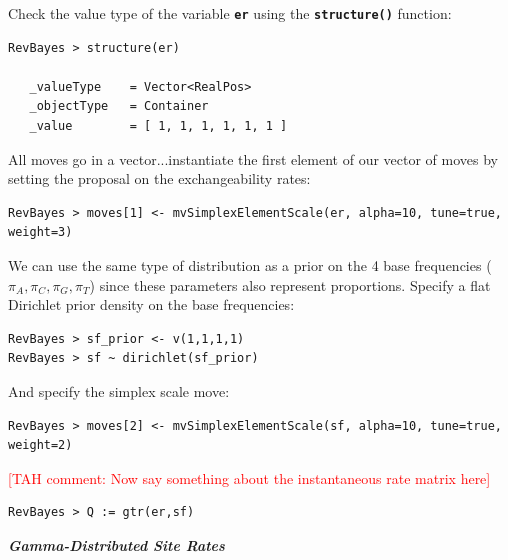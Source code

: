 \documentclass[11pt]{article}
\newcommand{\taha}[1]{{\textcolor{red}{[TAH comment: #1]}}} %
\newcommand{\cl}[1]{{\texttt{\textbf{#1}}}}
\begin{document}
Check the value type of the variable \cl{er} using the \cl{structure()} function:

{\tt \begin{snugshade*}
\begin{lstlisting}
RevBayes > structure(er)

   _valueType    = Vector<RealPos>
   _objectType   = Container
   _value        = [ 1, 1, 1, 1, 1, 1 ]
\end{lstlisting}
\end{snugshade*}}

All moves go in a vector...instantiate the first element of our vector of moves by setting the proposal on the exchangeability rates:

{\tt\small \begin{snugshade*}
\begin{lstlisting}
RevBayes > moves[1] <- mvSimplexElementScale(er, alpha=10, tune=true, weight=3) 
\end{lstlisting}
\end{snugshade*}}



We can use the same type of distribution as a prior on the 4 base frequencies ($\pi_A, \pi_C, \pi_G, \pi_T$) since these parameters also represent proportions. 
Specify a flat Dirichlet prior density on the base frequencies:

{\tt \begin{snugshade*}
\begin{lstlisting}
RevBayes > sf_prior <- v(1,1,1,1) 
RevBayes > sf ~ dirichlet(sf_prior)
\end{lstlisting}
\end{snugshade*}}

And specify the simplex scale move:
{\tt \small \begin{snugshade*}
\begin{lstlisting}
RevBayes > moves[2] <- mvSimplexElementScale(sf, alpha=10, tune=true, weight=2)  
\end{lstlisting}
\end{snugshade*}}

\taha{Now say something about the instantaneous rate matrix here}

{\tt \begin{snugshade*}
\begin{lstlisting}
RevBayes > Q := gtr(er,sf)
\end{lstlisting}
\end{snugshade*}}


\textbf{\textit{Gamma-Distributed Site Rates}}
\end{document}
